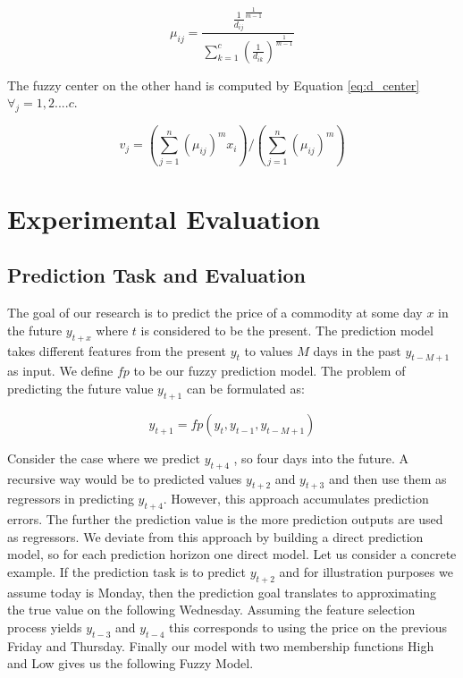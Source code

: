 \begin{equation} \label{eq:d_fuzz}
\mu_{ij} = \frac { \frac {1} {d_{ij}} ^{ \frac{1}{m-1}} } { \sum\limits_{k=1} ^c (\frac {1} {d_{ik}  } ) ^ { \frac{1}{m-1}} }
 \end{equation}

The fuzzy center on the other hand is computed by Equation \ref{eq:d_center} $\forall_j = 1,2....c$.

\begin{equation} \label{eq:d_center}
v_j = (\sum\limits_{j=1} ^n (\mu_{ij})^m x_i ) / (\sum\limits_{j=1} ^n (\mu_{ij})^m)
 \end{equation}



\section{Experimental Evaluation}




\subsection{Prediction Task and Evaluation}
\label{5.5}

The goal of our research is to predict the price of a commodity at some day $x$ in the future $y_{t+x}$ where $t$ is considered to be the present. The prediction model takes different features from the present $y_t $ to values $M$ days in the past $y_{t-M+1}$ as input. We define $fp$ to be our fuzzy prediction model. The problem of predicting the future value $y_{t+1}$ can be formulated as: 

\begin{equation} \label{eq:solve_model}
y_{t + 1} = fp(y_{t}, y_{t-1}, y_{t-M+1})
 \end{equation}
 
 Consider the case where we predict $y_{t +4}$ , so four days into the future. A recursive way would be to predicted values $y_{t+2}$ and $y_{t+3}$ and then use them as regressors in predicting $y_{t +4}$. However, this approach accumulates prediction errors. The further the prediction value is the more prediction outputs are used as regressors. We deviate from this approach by building a direct prediction model, so for each prediction horizon one direct model. Let us consider a concrete example. If the prediction task is to predict $y_{t+2}$ and for illustration purposes we assume today is Monday, then the prediction goal translates to approximating the true value on the following Wednesday. Assuming the feature selection process yields $y_{t-3}$  and $y_{t-4}$ this corresponds to using the price on the previous Friday and Thursday. Finally our model with two membership functions High and Low gives us the following Fuzzy Model. \\


